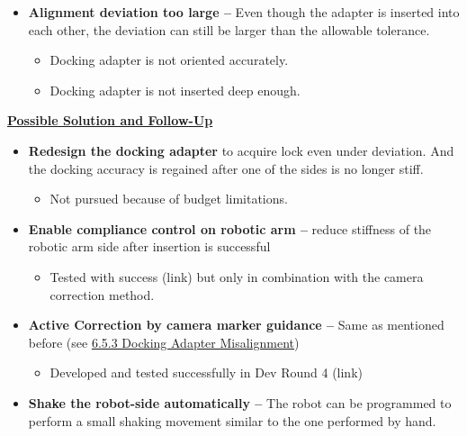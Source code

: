 {\begin{itemize}
\begin{itemize}
	\item Note that automatic tool changers, like this Schunk SWA 040, are designed for tool change at a storage location. The tool-side is often not held down by a stiff attachment.

\end{itemize}
	\item \textbf{Alignment deviation too large --} Even though the adapter is inserted into each other, the deviation can still be larger than the allowable tolerance.

\begin{itemize}
	\item Docking adapter is not oriented accurately.

	\item Docking adapter is not inserted deep enough.

\end{itemize}
\end{itemize}
\textbf{\ul{Possible Solution and Follow-Up}}

\begin{itemize}
	\item \textbf{Redesign the docking adapter} to acquire lock even under deviation. And the docking accuracy is regained after one of the sides is no longer stiff.

\begin{itemize}
	\item Not pursued because of budget limitations.

\end{itemize}
	\item \textbf{Enable compliance control on robotic arm --} reduce stiffness of the robotic arm side after insertion is successful

\begin{itemize}
	\item Tested with success (link) but only in combination with the camera correction method.

\end{itemize}
	\item \textbf{Active Correction by camera marker guidance --} Same as mentioned before (see \ul{6.5.3 Docking Adapter Misalignment})

\begin{itemize}
	\item Developed and tested successfully in Dev Round 4 (link)

\end{itemize}
	\item \textbf{Shake the robot-side automatically --} The robot can be programmed to perform a small shaking movement similar to the one performed by hand.


\end{itemize}}
